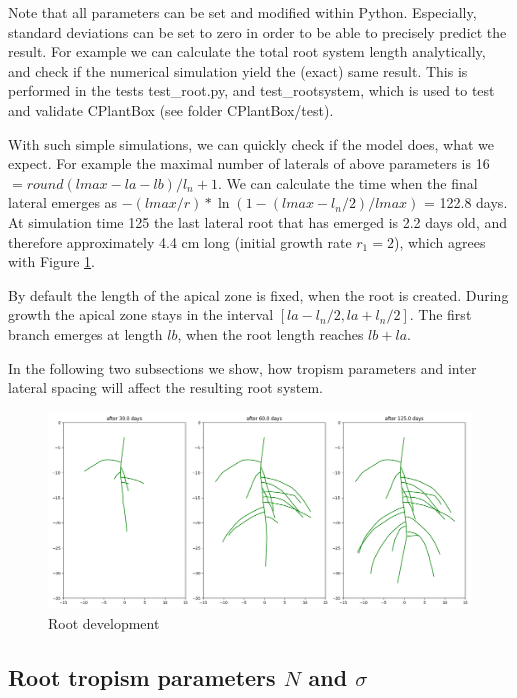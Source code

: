Note that all parameters can be set and modified within Python. Especially, standard deviations can be set to zero in order to be able to precisely predict the result. For example we can calculate the total root system length analytically, and check if the numerical simulation yield the (exact) same result. This is performed in the tests test\_root.py, and test\_rootsystem, which is used to test and validate CPlantBox (see folder CPlantBox/test).

With such simple simulations, we can quickly check if the model does, what we expect. For example the maximal number of laterals of above parameters is 16 
$= round(lmax - la - lb)/l_n +  1$. We can calculate the time when the final lateral emerges as $-(lmax/r)*\ln(1-(lmax-l_n/2)/lmax)$ = 122.8 days. At simulation time 125 the last lateral root that has emerged is 2.2 days old, and therefore approximately 4.4 cm long (initial growth rate $r_1 = 2$), which agrees with Figure \ref{fig:ip}.

By default the length of the apical zone is fixed, when the root is created. During growth the apical zone stays in the interval $[la - l_n/2, la+l_n/2]$. The first branch emerges at length $lb$, when the root length reaches $lb +la$.

In the following two subsections we show, how tropism parameters and inter lateral spacing will affect the resulting root system.

\begin{figure}
\centering
\includegraphics[width=\textwidth]{fig_initializeparams.png}
\caption{Root development} \label{fig:ip}
\end{figure}



\subsection{Root tropism parameters $N$ and $\sigma$} \label{ssec:tropism}

